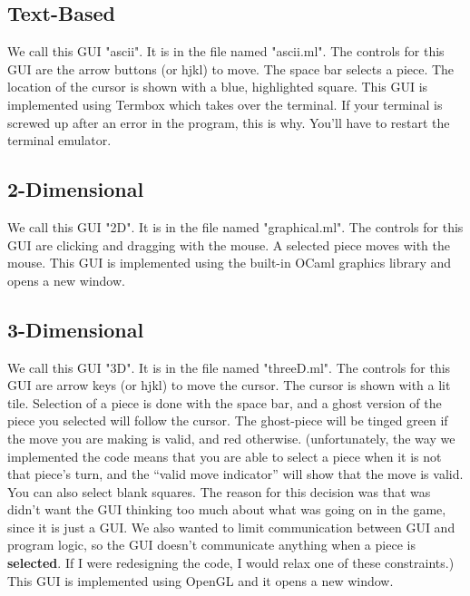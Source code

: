 \documentclass[11pt, oneside]{article}
\begin{document}
\subsection{Text-Based}
We call this GUI "ascii".  It is in the file named "ascii.ml".  The controls for
this GUI are the arrow buttons (or hjkl) to move.  The space bar selects a
piece.  The location of the cursor is shown with a blue, highlighted square.
This GUI is implemented using Termbox which takes over the terminal. If your
terminal is screwed up after an error in the program, this is why. You'll have
to restart the terminal emulator.

\subsection{2-Dimensional}
We call this GUI "2D".  It is in the file named "graphical.ml".  The controls
for this GUI are clicking and dragging with the mouse.  A selected piece moves
with the mouse.  This GUI is implemented using the built-in OCaml graphics
library and opens a new window.

\subsection{3-Dimensional}
We call this GUI "3D". It is in the file named "threeD.ml".  The controls for
this GUI are arrow keys (or hjkl) to move the cursor.  The cursor is shown with a lit tile.
Selection of a piece is done with the space bar, and a ghost version of the
piece you selected will follow the cursor. The ghost-piece will be tinged green
if the move you are making is valid, and red otherwise. (unfortunately, the way
we implemented the code means that you are able to select a piece when it is not
that piece's turn, and the ``valid move indicator'' will show that the move is
valid. You can also select blank squares. The reason for this decision was that
was didn't want the GUI thinking too much about what was going on in the game,
since it is just a GUI. We also wanted to limit communication between GUI and
program logic, so the GUI doesn't communicate anything when a piece is
\textbf{selected}. If I were redesigning the code, I would relax one of these
constraints.) This GUI is implemented using OpenGL and it opens a new window.
\end{document}

